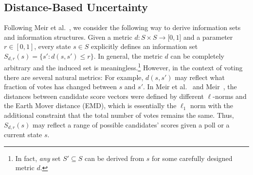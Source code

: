 \documentclass[letterpaper]{article} %
\begin{document}
\subsection{Distance-Based Uncertainty}
Following Meir et al.~, we consider the following way to derive information sets and information structures. 
 Given a metric $d:S\times S\rightarrow \mathbb [0,1]$ and a parameter $r\in [0,1]$, every state $s\in S$ explicitly defines an information set $S_{d,r}(s)=\{s' : d(s,s')\leq r\}$. In general, the metric $d$ can be completely arbitrary and the induced set is meaningless.\footnote{In fact, \emph{any} set $S'\subseteq S$ can be derived from $s$ for some carefully designed metric $d$.} However, in the context of voting there are several natural metrics: For example, $d(s,s')$ may reflect what fraction of votes has changed between $s$ and $s'$. 
 In Meir et al.~ and Meir~, the distances between candidate score vectors were defined by different $\ell$-norms and the Earth Mover distance (EMD), 	which is essentially the $\ell_1$ norm with the additional constraint that the total number of votes remains the same. Thus, $S_{d,r}(s)$ may reflect a range of possible candidates' scores given a poll or a current state $s$. 
\end{document}
